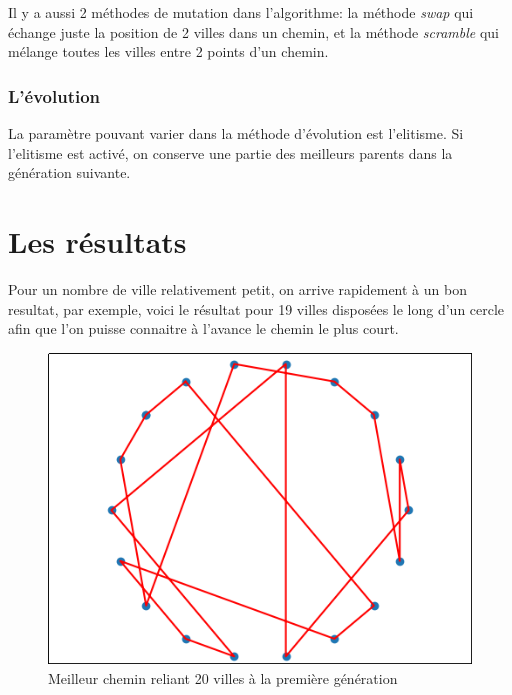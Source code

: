 \documentclass[11pt]{article}
\begin{document}
Il y a aussi 2 méthodes de mutation dans l'algorithme: la méthode \emph{swap} qui échange juste
la position de 2 villes dans un chemin, et la méthode \emph{scramble} qui mélange toutes les villes
entre 2 points d'un chemin.

\subsubsection{L'évolution}
\label{sec-2-2-3}

La paramètre pouvant varier dans la méthode d'évolution est l'elitisme. Si l'elitisme
est activé, on conserve une partie des meilleurs parents dans la génération suivante.

\section{Les résultats}
\label{sec-3}

Pour un nombre de ville relativement petit, on arrive rapidement à un bon resultat, par exemple, voici le résultat pour 19 villes disposées
le long d'un cercle afin que l'on puisse connaitre à l'avance le chemin le plus court.

\begin{figure}[htb]
\centering
\includegraphics[width=.9\linewidth]{./gen1.png}
\caption{Meilleur chemin reliant 20 villes à la première génération}
\end{figure}
\end{document}
